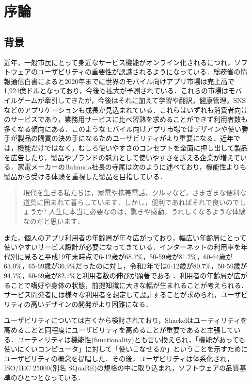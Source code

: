 \chapter{序論}
\label{chap:introduction}

\section{背景}

近年，一般市民にとって身近なサービス機能がオンライン化されるにつれ，ソフトウェアのユーザビリティの重要性が認識されるようになっている\cite{kurosu}．総務省の情報通信白書によると2020年までに世界のモバイル向けアプリ市場は売上高で1,924億ドルとなっており，今後も拡大が予測されている．これらの市場はモバイルゲームが牽引してきたが，今後はそれに加えて学習や翻訳，健康管理，SNSなどのアプリケーションも成長が見込まれている\cite{hakusyo}．これらはいずれも消費者向けのサービスであり，業務用サービスに比べ習熟を求めることができず利用者数も多くなる傾向にある．このようなモバイル向けアプリ市場ではデザインや使い勝手が製品の購買の決め手になるためユーザビリティがより重要になる．近年では，機能だけではなく，むしろ使いやすさのコンセプトを全面に押し出して製品を広告したり，製品やブランドの魅力として使いやすさを訴える企業が増えている\cite{tullis2014}．家電メーカーのBalmuda社長の寺尾は次のように述べており，機能性よりも製品から受ける体験を重視した製品を目指している．\begin{quotation}
  現代を生きる私たちは，家電や携帯電話，クルマなど，さまざまな便利な道具に囲まれて暮らしています．しかし，便利であればそれで良いのでしょうか? 人生に本当に必要なのは，驚きや感動，うれしくなるような体験なのだと思います\cite{terao}．
\end{quotation}


また，個人のアプリ利用者の年齢層が年々広がっており，幅広い年齢層にとって使いやすいサービス設計が必要になってきている．インターネットの利用率を年代別に見ると平成19年末時点で6-12歳が68.7\%，50-59歳が81.2\%，60-64歳が63.0\%，65-69歳が36.9\%だったのに対し，令和2年では6-12歳が80.7\%，50-59歳が94.7\%，60-69歳が82.7\%と利用者数の伸びが顕著である\cite{doukou1}\cite{doukou2} ．利用者の年齢層が広がることで嗜好や身体の状態，前提知識に大きな幅が生まれることが考えられる．サービス開発者には様々な利用者を想定して設計することが求められ，ユーザビリティの高いデザインの開発がより困難になる．

ユーザビリティについては古くから検討されており，Shackel\cite{shackel1991human}はユーティリティを高めることと同程度にユーザビリティを高めることが重要であると主張している．ユーティリティは機能性(functionality)とも言い換えられ，「機能があっても使いにくいコンピュータ」に対して「使いこなせるか」ということを示すためにユーザビリティの概念を提唱した\cite{kurosu}．その後，ユーザビリティは体系化され，ISO/IEC 25000(別名 SQuaRE)の規格の中に取り込まれ，ソフトウェアの品質基準のひとつとなっている．

